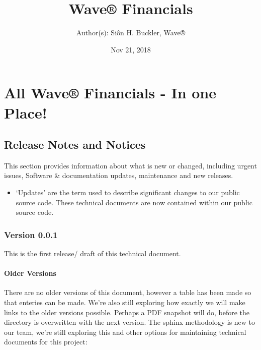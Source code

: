 \documentclass[letterpaper,10pt,english]{sphinxmanual}
\title{Wave® Financials}
\date{Nov 21, 2018}
\author{Author(s): Siôn H. Buckler, Wave®}
\begin{document}
\pagestyle{empty}
\maketitle
\pagestyle{plain}
\sphinxtableofcontents
\pagestyle{normal}
\label{\detokenize{index::doc}}



\chapter{All Wave® Financials - In one Place!}
\label{\detokenize{index:all-wave-financials-in-one-place}}

\section{Release Notes and Notices}
\label{\detokenize{releasenotes:release-notes-and-notices}}\label{\detokenize{releasenotes::doc}}
This section provides information about what is new or changed, including urgent issues, Software \& documentation updates, maintenance and new releases.
\begin{itemize}
\item {} 
‘Updates’ are the term used to describe significant changes to our public source code. These technical documents are now contained within our public source code.

\end{itemize}


\subsection{Version 0.0.1}
\label{\detokenize{releasenotes:version-0-0-1}}
This is the first release/ draft of this technical document.


\subsubsection{Older Versions}
\label{\detokenize{releasenotes:older-versions}}
There are no older versions of this document, however a table has been made so that enteries can be made. We’re also still exploring how exactly we will make links to the older versions possible. Perhaps a PDF snapshot will do, before the directory is overwritten with the next version. The sphinx methodology is new to our team, we’re still exploring this and other options for maintaining technical documents for this project:
\end{document}
